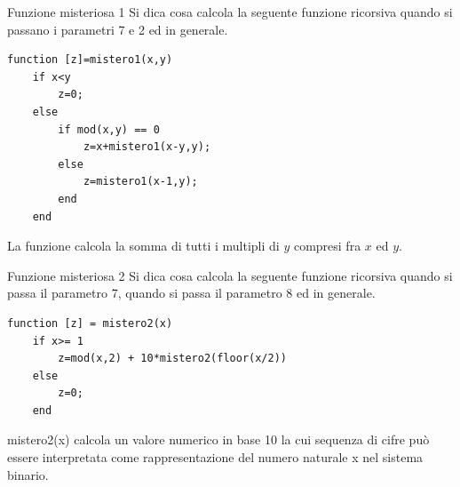 \documentclass[format=169,]{beamer}
\begin{document}
\begin{frame}[fragile]{Funzione misteriosa 1}
	Si dica cosa calcola la seguente funzione ricorsiva quando si passano i parametri 7 e 2 ed in generale.
	
\begin{lstlisting}[style=matlab, basicstyle=\small]
function [z]=mistero1(x,y)
    if x<y
        z=0;
    else
        if mod(x,y) == 0
            z=x+mistero1(x-y,y);
        else
            z=mistero1(x-1,y);
        end
    end
\end{lstlisting}
	
	\pause
	La funzione calcola la somma di tutti i multipli di $y$ compresi fra $x$ ed $y$.
\end{frame}

\begin{frame}[fragile]{Funzione misteriosa 2}
	Si dica cosa calcola la seguente funzione ricorsiva quando si passa il parametro 7, quando si passa il parametro 8 ed in generale.
	
\begin{lstlisting}[style=matlab]
function [z] = mistero2(x)
    if x>= 1
        z=mod(x,2) + 10*mistero2(floor(x/2))
    else
        z=0;
    end
\end{lstlisting}

\pause
mistero2(x) calcola un valore numerico in base 10 la cui sequenza di cifre può essere
interpretata come rappresentazione del numero naturale x nel sistema binario.
\end{frame}
\end{document}
